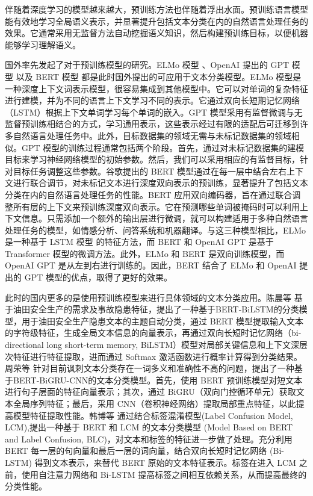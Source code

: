 
伴随着深度学习的模型越来越大，预训练方法也伴随着浮出水面。预训练语言模型能有效地学习全局语义表示，并显著提升包括文本分类在内的自然语言处理任务的效果。它通常采用无监督方法自动挖掘语义知识，然后构建预训练目标，以便机器能够学习理解语义。

国外率先发起了对于预训练模型的研究。ELMo 模型 \cite{Peters2018DeepCW}、OpenAI 提出的 GPT 模型 \cite{gpt} 以及 BERT 模型 \cite{devlin_bert_2019} 都是此时国外提出的可应用于文本分类模型。ELMo 模型是一种深度上下文词表示模型，很容易集成到其他模型中。它可以对单词的复杂特征进行建模，并为不同的语言上下文学习不同的表示。它通过双向长短期记忆网络（LSTM）根据上下文单词学习每个单词的嵌入。GPT 模型采用有监督微调与无监督预训练相结合的方式，学习通用表示，这些表示经过有限的适配后可迁移到许多自然语言处理任务中。此外，目标数据集的领域无需与未标记数据集的领域相似。GPT 模型的训练过程通常包括两个阶段。首先，通过对未标记数据集的建模目标来学习神经网络模型的初始参数。然后，我们可以采用相应的有监督目标，针对目标任务调整这些参数。谷歌提出的 BERT 模型通过在每一层中结合左右上下文进行联合调节，对未标记文本进行深度双向表示的预训练，显著提升了包括文本分类在内的自然语言处理任务的性能。BERT 应用双向编码器，旨在通过联合调整所有层的上下文来预训练深度双向表示。它在预测哪些单词被掩码时可以利用上下文信息。只需添加一个额外的输出层进行微调，就可以构建适用于多种自然语言处理任务的模型，如情感分析、问答系统和机器翻译。与这三种模型相比，ELMo 是一种基于 LSTM 模型 \cite{LSTM} 的特征方法，而 BERT 和 OpenAI GPT 是基于 Transformer 模型的微调方法。此外，ELMo 和 BERT 是双向训练模型，而 OpenAI GPT 是从左到右进行训练的。因此，BERT 结合了 ELMo 和 OpenAI 提出的 GPT 模型的优点，取得了更好的效果。

此时的国内更多的是使用预训练模型来进行具体领域的文本分类应用。陈晨等 \cite{KXJS202429028} 基于油田安全生产的需求及事故隐患特征，提出了一种基于BERT-BiLSTM的分类模型，用于油田安全生产隐患文本的主题自动分类，通过 BERT 模型提取输入文本的字符级特征，生成全局文本信息的向量表示，再通过双向长短时记忆网络（bi-directional long short-term memory, BiLSTM）模型对局部关键信息和上下文深层次特征进行特征提取，进而通过 Softmax 激活函数进行概率计算得到分类结果。周荣等 \cite{DLXZ20240909001} 针对目前讽刺文本分类存在一词多义和准确性不高的问题，提出了一种基于BERT-BiGRU-CNN的文本分类模型。首先，使用 BERT 预训练模型对短文本进行句子层面的特征向量表示；其次，通过 BiGRU（双向门控循环单元）获取文本全局序列特征；最后，采用 CNN（卷积神经网络）提取局部重点特征，以此提高模型特征提取性能。韩博等 \cite{NJYD202403012} 通过结合标签混淆模型(Label Confusion Model, LCM),提出一种基于 BERT 和 LCM 的文本分类模型 (Model Based on BERT and Label Confusion, BLC)，对文本和标签的特征进一步做了处理。充分利用 BERT 每一层的句向量和最后一层的词向量，结合双向长短时记忆网络 (Bi-LSTM) 得到文本表示，来替代 BERT 原始的文本特征表示。标签在进入 LCM 之前，使用自注意力网络和 Bi-LSTM 提高标签之间相互依赖关系，从而提高最终的分类性能。

